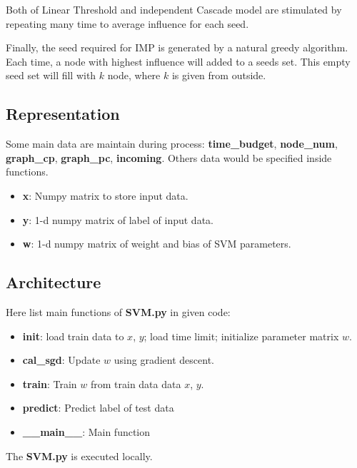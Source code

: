 \documentclass[conference,compsoc]{IEEEtran}
\begin{document}
Both of Linear Threshold and independent Cascade model are stimulated by
repeating many time to average influence for each seed.

Finally, the seed required for IMP is generated by a natural greedy algorithm.
Each time, a node with highest influence will added to a seeds set. This empty
seed set will fill with $k$ node, where $k$ is given from outside.

\subsection{Representation}
Some main data are maintain during process: \textbf{time\_budget},
\textbf{node\_num}, \textbf{graph\_cp}, \textbf{graph\_pc}, \textbf{incoming}.
Others data would be specified inside functions.

\begin{itemize}
  \item \textbf{x}: Numpy matrix to store input data.
  \item \textbf{y}: 1-d numpy matrix of label of input data.
  \item \textbf{w}: 1-d numpy matrix of weight and bias of SVM parameters.
\end{itemize}


\subsection{Architecture}
Here list main functions of \textbf{SVM.py} in given code:
\begin{itemize}
    \item \textbf{init}: load train data to $x$, $y$; load time limit; initialize
	    parameter matrix $w$.
    \item \textbf{cal\_sgd}: Update $w$ using gradient descent.
    \item \textbf{train}: Train $w$ from train data data $x$, $y$.
    \item \textbf{predict}: Predict label of test data
    \item \textbf{\_\_main\_\_}: Main function
\end{itemize}

The \textbf{SVM.py} is executed locally.
\end{document}
